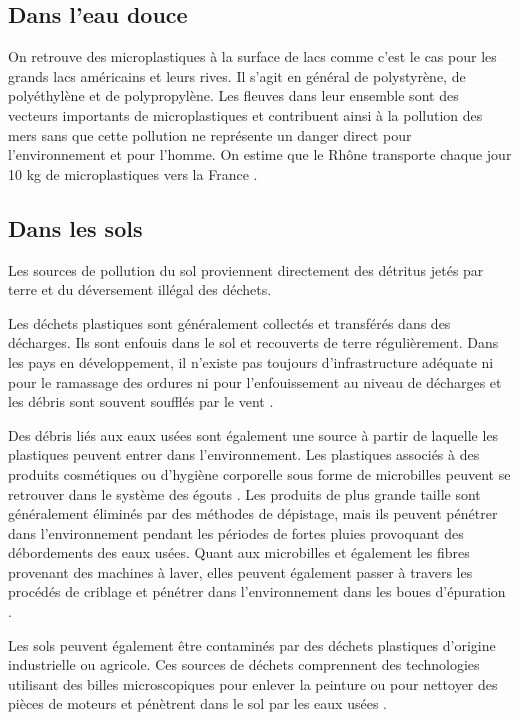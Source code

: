 \subsection{Dans l'eau douce}
\par{
On retrouve des microplastiques \`a la surface de lacs comme c'est le cas pour les grands lacs am\'ericains et leurs rives. Il s'agit en g\'en\'eral de polystyr\`ene, de poly\'ethyl\`ene et de polypropyl\`ene. Les  fleuves  dans  leur  ensemble  sont  des  vecteurs importants  de  microplastiques  et  contribuent  ainsi  \`a  la pollution  des  mers sans que cette pollution ne repr\'esente un danger direct pour l'environnement et pour l'homme. On estime que le Rh\^one transporte chaque jour 10 kg de microplastiques vers la France {\citep{Schafer2015}}.
}

\subsection{Dans les sols}
\par{
Les sources de pollution du sol proviennent directement des d\'etritus jet\'es par terre et du d\'eversement ill\'egal des d\'echets.
}
\par{
Les d\'echets plastiques sont g\'en\'eralement collect\'es et transf\'er\'es dans des d\'echarges. Ils sont enfouis dans le sol et recouverts de terre r\'eguli\`erement. Dans les pays en d\'eveloppement, il n'existe pas toujours d'infrastructure ad\'equate ni pour le ramassage des ordures ni pour l'enfouissement au niveau de d\'echarges et les d\'ebris sont souvent souffl\'es par le vent {\citep{lambert2014occurrence}}. 
}
\par{
Des d\'ebris li\'es aux eaux us\'ees sont \'egalement une source \`a partir de laquelle les plastiques peuvent entrer dans l'environnement. Les plastiques associ\'es \`a des produits cosm\'etiques ou d'hygi\`ene corporelle sous forme de microbilles peuvent se retrouver dans le syst\`eme des \'egouts {\citep{Schafer2015}}. Les produits de plus grande taille sont g\'en\'eralement \'elimin\'es par des m\'ethodes de d\'epistage, mais ils peuvent p\'en\'etrer dans l'environnement pendant les p\'eriodes de fortes pluies provoquant des d\'ebordements des eaux us\'ees. Quant aux microbilles et \'egalement les fibres provenant des machines \`a laver, elles peuvent \'egalement passer \`a travers les proc\'ed\'es de criblage et p\'en\'etrer dans l'environnement dans les boues d'\'epuration {\citep{lambert2014occurrence}}.
 }
 \par{
Les sols peuvent \'egalement \^etre contamin\'es par des d\'echets plastiques d'origine industrielle ou agricole. Ces sources de d\'echets comprennent des technologies utilisant des billes microscopiques pour enlever la peinture ou pour nettoyer des pi\`eces de moteurs et p\'en\`etrent dans le sol par les eaux us\'ees {\citep{lambert2014occurrence}}. 
}

